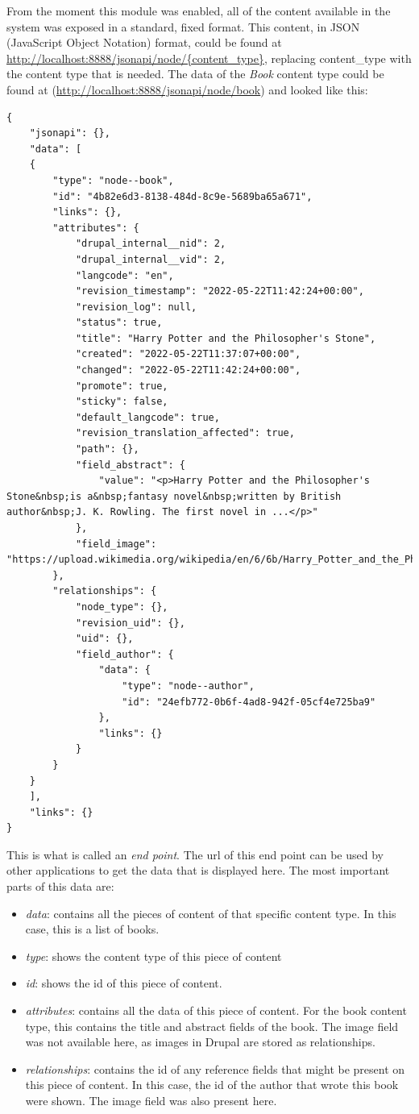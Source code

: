 From the moment this module was enabled, all of the content available in the system was exposed in a standard, fixed format. This content, in JSON (JavaScript Object Notation) format, could be found at \url{http://localhost:8888/jsonapi/node/{content_type}}, replacing {content_type} with the content type that is needed. The data of the \emph{Book} content type could be found at (\url{http://localhost:8888/jsonapi/node/book}) and looked like this:

\begin{lstlisting}
{
	"jsonapi": {},
	"data": [
	{
		"type": "node--book",
		"id": "4b82e6d3-8138-484d-8c9e-5689ba65a671",
		"links": {},
		"attributes": {
			"drupal_internal__nid": 2,
			"drupal_internal__vid": 2,
			"langcode": "en",
			"revision_timestamp": "2022-05-22T11:42:24+00:00",
			"revision_log": null,
			"status": true,
			"title": "Harry Potter and the Philosopher's Stone",
			"created": "2022-05-22T11:37:07+00:00",
			"changed": "2022-05-22T11:42:24+00:00",
			"promote": true,
			"sticky": false,
			"default_langcode": true,
			"revision_translation_affected": true,
			"path": {},
			"field_abstract": {
				"value": "<p>Harry Potter and the Philosopher's Stone&nbsp;is a&nbsp;fantasy novel&nbsp;written by British author&nbsp;J. K. Rowling. The first novel in ...</p>"
			},
			"field_image": "https://upload.wikimedia.org/wikipedia/en/6/6b/Harry_Potter_and_the_Philosopher%27s_Stone_Book_Cover.jpg"
		},
		"relationships": {
			"node_type": {},
			"revision_uid": {},
			"uid": {},
			"field_author": {
				"data": {
					"type": "node--author",
					"id": "24efb772-0b6f-4ad8-942f-05cf4e725ba9"
				},
				"links": {}
			}
		}
	}
	],
	"links": {}
}
\end{lstlisting}

This is what is called an \emph{end point}. The url of this end point can be used by other applications to get the data that is displayed here. The most important parts of this data are:

\begin{itemize}
	\item \emph{data}: contains all the pieces of content of that specific content type. In this case, this is a list of books.
	\item \emph{type}: shows the content type of this piece of content
	\item \emph{id}: shows the id of this piece of content.
	\item \emph{attributes}: contains all the data of this piece of content. For the book content type, this contains the title and abstract fields of the book. The image field was not available here, as images in Drupal are stored as relationships.
	\item \emph{relationships}: contains the id of any reference fields that might be present on this piece of content. In this case, the id of the author that wrote this book were shown. The image field was also present here.
\end{itemize}

